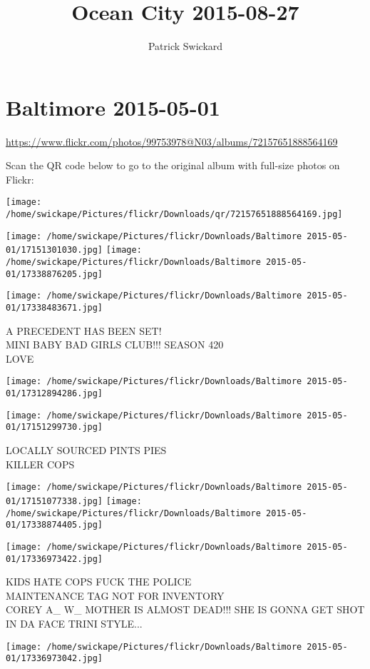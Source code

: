 \documentclass[10pt,letterpaper]{article}
\title{Ocean City 2015-08-27}
\author{Patrick Swickard}
\date{}
\begin{document}
\section*{Baltimore 2015-05-01}

\url{https://www.flickr.com/photos/99753978@N03/albums/72157651888564169}

Scan the QR code below to go to the original album with full-size photos on Flickr:

\texttt{[image: /home/swickape/Pictures/flickr/Downloads/qr/72157651888564169.jpg]}
\pagebreak

\texttt{[image: /home/swickape/Pictures/flickr/Downloads/Baltimore 2015-05-01/17151301030.jpg]}
\texttt{[image: /home/swickape/Pictures/flickr/Downloads/Baltimore 2015-05-01/17338876205.jpg]}

\texttt{[image: /home/swickape/Pictures/flickr/Downloads/Baltimore 2015-05-01/17338483671.jpg]}

A PRECEDENT HAS BEEN SET!\\
MINI BABY BAD GIRLS CLUB!!! SEASON 420\\
LOVE
\pagebreak

\texttt{[image: /home/swickape/Pictures/flickr/Downloads/Baltimore 2015-05-01/17312894286.jpg]}

\vspace{0.25in}
\texttt{[image: /home/swickape/Pictures/flickr/Downloads/Baltimore 2015-05-01/17151299730.jpg]}

LOCALLY SOURCED PINTS PIES\\
KILLER COPS
\pagebreak

\texttt{[image: /home/swickape/Pictures/flickr/Downloads/Baltimore 2015-05-01/17151077338.jpg]}
\texttt{[image: /home/swickape/Pictures/flickr/Downloads/Baltimore 2015-05-01/17338874405.jpg]}

\vspace{0.25in}
\texttt{[image: /home/swickape/Pictures/flickr/Downloads/Baltimore 2015-05-01/17336973422.jpg]}

KIDS HATE COPS FUCK THE POLICE\\
MAINTENANCE TAG NOT FOR INVENTORY\\
COREY A\_ W\_ MOTHER IS ALMOST DEAD!!!  SHE IS GONNA GET SHOT IN DA FACE TRINI STYLE...
\pagebreak

\texttt{[image: /home/swickape/Pictures/flickr/Downloads/Baltimore 2015-05-01/17336973042.jpg]}
\end{document}
